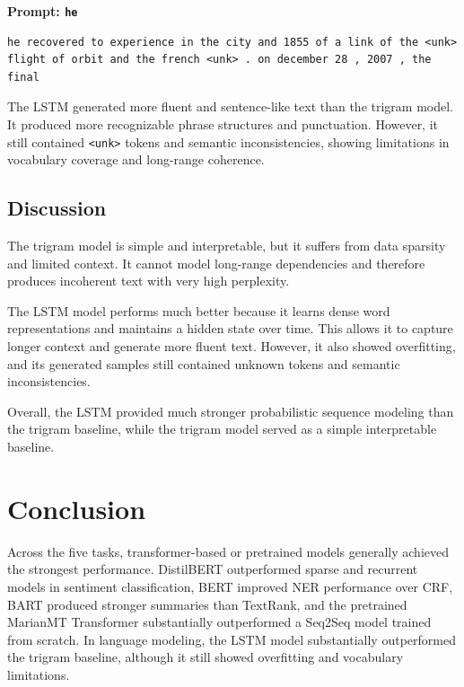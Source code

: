 \documentclass[11pt,a4paper]{article}
\begin{document}
\textbf{Prompt: \texttt{he}}
\begin{lstlisting}
he recovered to experience in the city and 1855 of a link of the <unk> flight of orbit and the french <unk> . on december 28 , 2007 , the final
\end{lstlisting}

The LSTM generated more fluent and sentence-like text than the trigram model. It produced more recognizable phrase structures and punctuation. However, it still contained \texttt{<unk>} tokens and semantic inconsistencies, showing limitations in vocabulary coverage and long-range coherence.

\subsection{Discussion}

The trigram model is simple and interpretable, but it suffers from data sparsity and limited context. It cannot model long-range dependencies and therefore produces incoherent text with very high perplexity.

The LSTM model performs much better because it learns dense word representations and maintains a hidden state over time. This allows it to capture longer context and generate more fluent text. However, it also showed overfitting, and its generated samples still contained unknown tokens and semantic inconsistencies.

Overall, the LSTM provided much stronger probabilistic sequence modeling than the trigram baseline, while the trigram model served as a simple interpretable baseline.

\section{Conclusion}

Across the five tasks, transformer-based or pretrained models generally achieved the strongest performance. DistilBERT outperformed sparse and recurrent models in sentiment classification, BERT improved NER performance over CRF, BART produced stronger summaries than TextRank, and the pretrained MarianMT Transformer substantially outperformed a Seq2Seq model trained from scratch. In language modeling, the LSTM model substantially outperformed the trigram baseline, although it still showed overfitting and vocabulary limitations.
\end{document}
